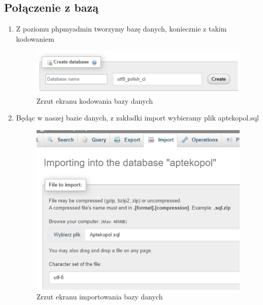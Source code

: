 \documentclass[12pt,a4paper]{article}
\begin{document}
    \subsection{Połączenie z bazą}
        \begin{enumerate}
            \item Z poziomu phpmyadmin tworzymy bazę danych, koniecznie z takim kodowaniem
                
                \begin{figure}[H]
                    \centering
                    \includegraphics[scale=0.4]{images/kodowanie.png}
                    \caption{Zrzut ekranu kodowania bazy danych}
                \end{figure}
                    
            \item Będąc w naszej bazie danych, z zakładki import wybieramy plik aptekopol.sql
                
                \begin{figure}[H]
                    \centering
                    \includegraphics[scale=0.4]{images/import.png}
                    \caption{Zrzut ekranu importowania bazy danych}
                \end{figure}
                    

\end{enumerate}
\end{document}
